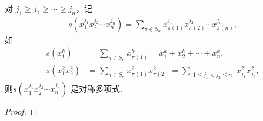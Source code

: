 \documentclass[../../main.tex]{subfiles}%
\begin{document}
\begin{example}\label{抽象代数--例题2.3.3}
对 \( j_1 \geqslant j_2 \geqslant \cdots \geqslant j_n \)，记
\begin{align*}
s(x_1^{j_1} x_2^{j_2} \cdots x_n^{j_n}) = \sum_{\pi \in S_n} x_{\pi(1)}^{j_1} x_{\pi(2)}^{j_2} \cdots x_{\pi(n)}^{j_n},
\end{align*}
如
\begin{align*}
s(x_1^k) &= \sum_{\pi \in S_n} x_{\pi(1)}^k = x_1^k + x_2^k + \cdots + x_n^k, \\
s(x_1^2 x_2^2) &= \sum_{\pi \in S_n} x_{\pi(1)}^2 x_{\pi(2)}^2 = \sum_{\substack{1 \leqslant j_1 < j_2 \leqslant n}} x_{j_1}^2 x_{j_2}^2,
\end{align*}
则\( s(x_1^{j_1} x_2^{j_2} \cdots x_n^{j_n}) \) 是对称多项式.
\end{example}
\begin{proof}

\end{proof}
\end{document}

